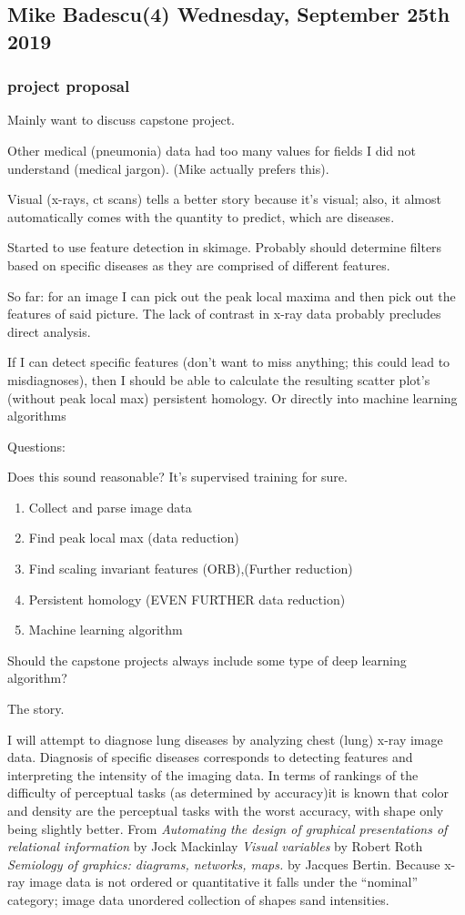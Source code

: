 \subsection{Mike Badescu(4) Wednesday, September 25th 2019}

\subsubsection{project proposal}
Mainly want to discuss capstone project.

Other medical (pneumonia) data had too many values
for fields I did not understand (medical jargon). (Mike actually
prefers this).

Visual (x-rays, ct scans) tells a better story
because it's visual; also, it almost automatically
comes with the quantity to predict, which are
diseases.

Started to use feature detection in skimage.
Probably should determine filters based on specific
diseases as they are comprised of different features.

So far: for an image I can pick out the peak local maxima
and then pick out the features of said picture. The
lack of contrast in x-ray data probably precludes
direct analysis.

If I can detect specific features (don't want to miss
anything; this could lead to misdiagnoses), then I should
be able to calculate the resulting scatter plot's (without peak local max)
persistent homology. Or directly into machine learning algorithms

Questions:

Does this sound reasonable? It's supervised training for sure.
\begin{enumerate}
\item Collect and parse image data
\item Find peak local max (data reduction)
\item Find scaling invariant features (ORB),(Further reduction)
\item Persistent homology (EVEN FURTHER data reduction)
\item Machine learning algorithm
\end{enumerate}

Should the capstone projects always include some type
of deep learning algorithm?

The story.

I will attempt to diagnose lung diseases by analyzing chest (lung)
x-ray image data. Diagnosis of specific diseases corresponds
to detecting features and interpreting the intensity of the imaging data.
In terms of rankings of the difficulty of perceptual tasks (as determined
by accuracy)it is known that color and density are the perceptual tasks
with the worst accuracy, with shape only being slightly better.
From \textit{Automating the design of graphical presentations of relational information} by Jock Mackinlay
\textit{Visual variables} by Robert Roth
\textit{Semiology of graphics: diagrams, networks, maps.} by Jacques Bertin.
Because x-ray image data is not ordered or quantitative it falls under
the ``nominal'' category; image data unordered collection of shapes sand intensities.

